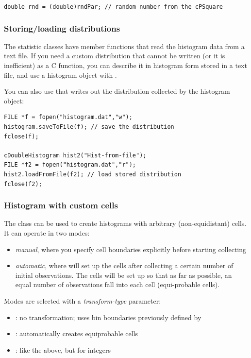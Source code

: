 \begin{verbatim}
double rnd = (double)rndPar; // random number from the cPSquare
\end{verbatim}

\subsubsection{Storing/loading distributions}


The statistic classes have  member functions
that read the histogram data from a text file. If you need a custom
distribution that cannot be written (or it
is inefficient) as a C function, you can describe it in histogram form
stored in a text file, and use a histogram object with
.

You can also use that writes out the distribution
collected by the histogram object:

\begin{verbatim}
FILE *f = fopen("histogram.dat","w");
histogram.saveToFile(f); // save the distribution
fclose(f);

cDoubleHistogram hist2("Hist-from-file");
FILE *f2 = fopen("histogram.dat","r");
hist2.loadFromFile(f2); // load stored distribution
fclose(f2);
\end{verbatim}


\subsubsection{Histogram with custom cells}


The  class can be used to create
histograms with arbitrary (non-equidistant) cells.
It can operate in two modes:

\begin{itemize}
  \item \textit{manual}, where you specify cell boundaries explicitly
     before starting collecting
  \item \textit{automatic}, where  will set up the cells
     after collecting a certain number of initial observations. The cells
     will be set up so that as far as possible, an equal number of observations
     fall into each cell (equi-probable cells).
\end{itemize}

Modes are selected with a \textit{transform-type} parameter:
\begin{itemize}
  \item{: no transformation; uses bin boundaries
    previously defined by }
  \item{: automatically creates equiprobable cells}
  \item{: like the above, but for integers}
\end{itemize}

